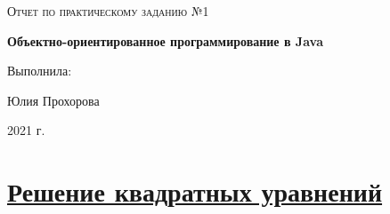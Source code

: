 \documentclass[a4paper]{article}
\begin{document}
\begin{titlepage}
	\centering
    
	\vspace{10cm}
	{\scshape\LARGE  Отчет по практическому заданию №1 \par}
	\vspace{1cm}
	{\huge\bfseries  Объектно-ориентированное программирование в Java\par}
	\vspace{1cm}
	\vfill
\begin{flushright}
	{\large Выполнила:}\par
	\vspace{0.3cm}
	{\LARGE Юлия Прохорова}
\end{flushright}
	
	\vfill

	2021 г.
\end{titlepage}

\newpage

\pagestyle{fancy} 
\fancyhead[C]{}
\fancyfoot{}
\fancyfoot[C]{ \noindent\rule{\textwidth}{0.4pt} \thepage }

\tableofcontents

\newpage

\newcommand{\RNumb}[1]{\uppercase\expandafter{\romannumeral #1\relax}}


\section{\href{https://github.com/julproh/5_sem/tree/main/NetCracker/Java_Basics_and_OOP/first_task/equations}{Решение квадратных уравнений}}
\end{document}
